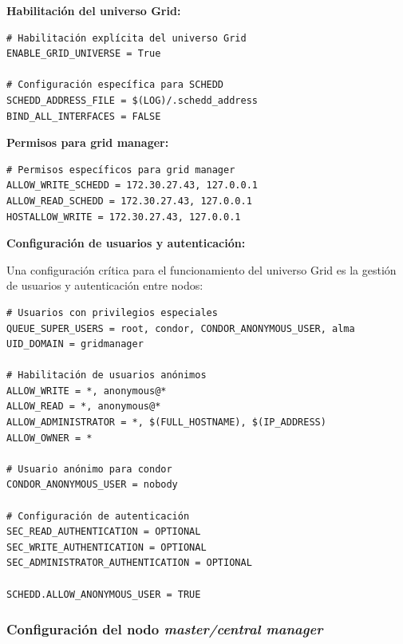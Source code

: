 \textbf{Habilitación del universo Grid:}

\begin{verbatim}
# Habilitación explícita del universo Grid
ENABLE_GRID_UNIVERSE = True

# Configuración específica para SCHEDD
SCHEDD_ADDRESS_FILE = $(LOG)/.schedd_address
BIND_ALL_INTERFACES = FALSE
\end{verbatim}

\textbf{Permisos para grid manager:}

\begin{verbatim}
# Permisos específicos para grid manager
ALLOW_WRITE_SCHEDD = 172.30.27.43, 127.0.0.1
ALLOW_READ_SCHEDD = 172.30.27.43, 127.0.0.1
HOSTALLOW_WRITE = 172.30.27.43, 127.0.0.1
\end{verbatim}

\textbf{Configuración de usuarios y autenticación:}

Una configuración crítica para el funcionamiento del universo Grid es la gestión de usuarios y autenticación entre nodos:

\begin{verbatim}
# Usuarios con privilegios especiales
QUEUE_SUPER_USERS = root, condor, CONDOR_ANONYMOUS_USER, alma
UID_DOMAIN = gridmanager

# Habilitación de usuarios anónimos
ALLOW_WRITE = *, anonymous@*
ALLOW_READ = *, anonymous@*
ALLOW_ADMINISTRATOR = *, $(FULL_HOSTNAME), $(IP_ADDRESS)
ALLOW_OWNER = *

# Usuario anónimo para condor
CONDOR_ANONYMOUS_USER = nobody

# Configuración de autenticación
SEC_READ_AUTHENTICATION = OPTIONAL
SEC_WRITE_AUTHENTICATION = OPTIONAL
SEC_ADMINISTRATOR_AUTHENTICATION = OPTIONAL

SCHEDD.ALLOW_ANONYMOUS_USER = TRUE
\end{verbatim}

\FloatBarrier\subsubsection{Configuración del nodo \textit{master/central manager}}

